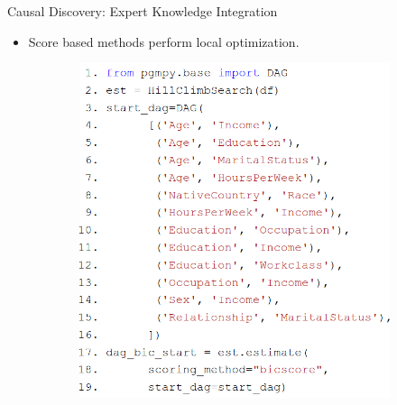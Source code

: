 \documentclass{beamer}
\begin{document}
\begin{frame}{Causal Discovery: Expert Knowledge Integration}
	\begin{itemize}
		\item Score based methods perform local optimization.
	\end{itemize}

	\vfill

	\begin{figure}
		\begin{subfigure}{0.55 \textwidth}
			\centering
			\includegraphics[scale=0.28]{imgs/adult_start.png}
		\end{subfigure}%
		\begin{subfigure}{0.45 \textwidth}
			\centering

\end{subfigure}
\end{figure}
\end{frame}
\end{document}
